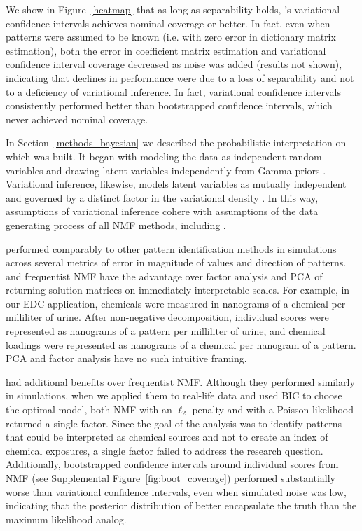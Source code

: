 We show in Figure~\ref{heatmap} that as long as separability holds, \bnmfc's variational confidence intervals achieves nominal coverage or better. In fact, even when patterns were assumed to be known (i.e. with zero error in dictionary matrix estimation), both the error in coefficient matrix estimation and variational confidence interval coverage decreased as noise was added (results not shown), indicating that declines in performance were due to a loss of separability and not to a deficiency of variational inference. In fact, variational confidence intervals consistently performed better than bootstrapped confidence intervals, which never achieved nominal coverage.

In Section~\ref{methods_bayesian} we described the probabilistic interpretation on which \bnmf was built. It began with modeling the data as independent random variables and drawing latent variables independently from Gamma priors \citep{cemgil2008bayesian, paisley2014bayesian}. Variational inference, likewise, models latent variables as mutually independent and governed by a distinct factor in the variational density \citep{blei2017variational}. In this way, assumptions of variational inference cohere with assumptions of the data generating process of all NMF methods, including \bnmf.

\bnmf performed comparably to other pattern identification methods in simulations across several metrics of error in magnitude of values and direction of patterns. \bnmf and frequentist NMF have the advantage over factor analysis and PCA of returning solution matrices on immediately interpretable scales. For example, in our EDC application, chemicals were measured in nanograms of a chemical per milliliter of urine. After non-negative decomposition, individual scores were represented as nanograms of a pattern per milliliter of urine, and chemical loadings were represented as nanograms of a chemical per nanogram of a pattern. PCA and factor analysis have no such intuitive framing.

\bnmf had additional benefits over frequentist NMF. Although they performed similarly in simulations, when we applied them to real-life data and used BIC to choose the optimal model, both NMF with an $\ell_2$ penalty and with a Poisson likelihood returned a single factor. Since the goal of the analysis was to identify patterns that could be interpreted as chemical sources and not to create an index of chemical exposures, a single factor failed to address the research question. Additionally, bootstrapped confidence intervals around individual scores from NMF (see Supplemental Figure~\ref{fig:boot_coverage}) performed substantially worse than variational confidence intervals, even when simulated noise was low, indicating that the posterior distribution of \bnmf better encapsulate the truth than the maximum likelihood analog.

